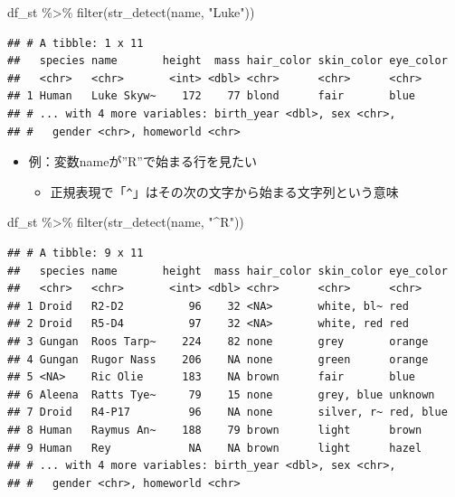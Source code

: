 \documentclass[
  xelatex,ja=standard, b5paper]{bxjsbook}
\newenvironment{Shaded}{\begin{snugshade}}{\end{snugshade}}
\newcommand{\FunctionTok}[1]{\textcolor[rgb]{0.00,0.00,0.00}{#1}}
\newcommand{\NormalTok}[1]{#1}
\newcommand{\SpecialCharTok}[1]{\textcolor[rgb]{0.00,0.00,0.00}{#1}}
\newcommand{\StringTok}[1]{\textcolor[rgb]{0.31,0.60,0.02}{#1}}
\providecommand{\tightlist}{%
  \setlength{\itemsep}{0pt}\setlength{\parskip}{0pt}}
\begin{document}
\begin{Shaded}
\begin{Highlighting}[]
\NormalTok{df\_st }\SpecialCharTok{\%\textgreater{}\%}
  \FunctionTok{filter}\NormalTok{(}\FunctionTok{str\_detect}\NormalTok{(name, }\StringTok{"Luke"}\NormalTok{))}
\end{Highlighting}
\end{Shaded}

\begin{verbatim}
## # A tibble: 1 x 11
##   species name       height  mass hair_color skin_color eye_color
##   <chr>   <chr>       <int> <dbl> <chr>      <chr>      <chr>    
## 1 Human   Luke Skyw~    172    77 blond      fair       blue     
## # ... with 4 more variables: birth_year <dbl>, sex <chr>,
## #   gender <chr>, homeworld <chr>
\end{verbatim}

\begin{itemize}
\tightlist
\item
  例：変数nameが''R''で始まる行を見たい

  \begin{itemize}
  \tightlist
  \item
    正規表現で「\texttt{\^{}}」はその次の文字から始まる文字列という意味
  \end{itemize}
\end{itemize}

\begin{Shaded}
\begin{Highlighting}[]
\NormalTok{df\_st }\SpecialCharTok{\%\textgreater{}\%}
  \FunctionTok{filter}\NormalTok{(}\FunctionTok{str\_detect}\NormalTok{(name, }\StringTok{"\^{}R"}\NormalTok{))}
\end{Highlighting}
\end{Shaded}

\begin{verbatim}
## # A tibble: 9 x 11
##   species name       height  mass hair_color skin_color eye_color
##   <chr>   <chr>       <int> <dbl> <chr>      <chr>      <chr>    
## 1 Droid   R2-D2          96    32 <NA>       white, bl~ red      
## 2 Droid   R5-D4          97    32 <NA>       white, red red      
## 3 Gungan  Roos Tarp~    224    82 none       grey       orange   
## 4 Gungan  Rugor Nass    206    NA none       green      orange   
## 5 <NA>    Ric Olie      183    NA brown      fair       blue     
## 6 Aleena  Ratts Tye~     79    15 none       grey, blue unknown  
## 7 Droid   R4-P17         96    NA none       silver, r~ red, blue
## 8 Human   Raymus An~    188    79 brown      light      brown    
## 9 Human   Rey            NA    NA brown      light      hazel    
## # ... with 4 more variables: birth_year <dbl>, sex <chr>,
## #   gender <chr>, homeworld <chr>
\end{verbatim}
\end{document}

